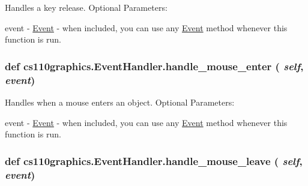 Handles a key release. Optional Parameters:
\begin{DoxyItemize}
\item event -\/ \hyperlink{classcs110graphics_1_1Event}{Event} -\/ when included, you can use any \hyperlink{classcs110graphics_1_1Event}{Event} method whenever this function is run. 
\end{DoxyItemize}\hypertarget{classcs110graphics_1_1EventHandler_a13af3268f8a1aa36b8483eb2deffef15}{
\subsubsection[{handle\_\-mouse\_\-enter}]{\setlength{\rightskip}{0pt plus 5cm}def cs110graphics.EventHandler.handle\_\-mouse\_\-enter ( {\em self}, \/   {\em event})}}
\label{classcs110graphics_1_1EventHandler_a13af3268f8a1aa36b8483eb2deffef15}


Handles when a mouse enters an object. Optional Parameters:
\begin{DoxyItemize}
\item event -\/ \hyperlink{classcs110graphics_1_1Event}{Event} -\/ when included, you can use any \hyperlink{classcs110graphics_1_1Event}{Event} method whenever this function is run. 
\end{DoxyItemize}\hypertarget{classcs110graphics_1_1EventHandler_a5deaf2b6b8055e97ac0ddf6603132c64}{
\subsubsection[{handle\_\-mouse\_\-leave}]{\setlength{\rightskip}{0pt plus 5cm}def cs110graphics.EventHandler.handle\_\-mouse\_\-leave ( {\em self}, \/   {\em event})}}
\label{classcs110graphics_1_1EventHandler_a5deaf2b6b8055e97ac0ddf6603132c64}


